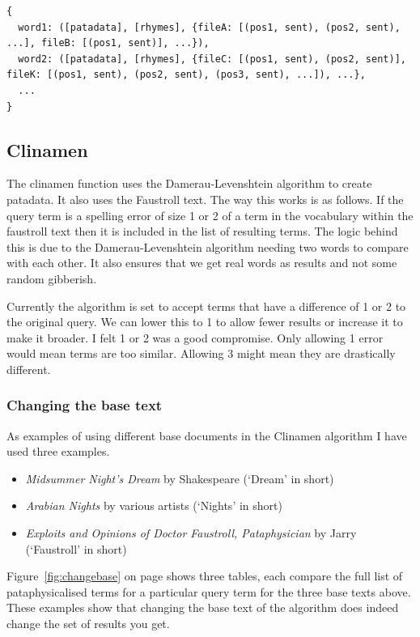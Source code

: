 \begin{verbatim}
{
  word1: ([patadata], [rhymes], {fileA: [(pos1, sent), (pos2, sent), ...], fileB: [(pos1, sent)], ...}),
  word2: ([patadata], [rhymes], {fileC: [(pos1, sent), (pos2, sent)], fileK: [(pos1, sent), (pos2, sent), (pos3, sent), ...]), ...},
  ...
}
\end{verbatim}


\subsection{Clinamen}
\label{s:clinanal}

The clinamen function uses the Damerau-Levenshtein algorithm to create pata\-data. It also uses the Faustroll text. The way this works is as follows. If the query term is a spelling error of size 1 or 2 of a term in the vocabulary within the faustroll text then it is included in the list of resulting terms. The logic behind this is due to the Damerau-Levenshtein algorithm needing two words to compare with each other. It also ensures that we get real words as results and not some random gibberish.

Currently the algorithm is set to accept terms that have a difference of 1 or 2 to the original query. We can lower this to 1 to allow fewer results or increase it to make it broader. I felt 1 or 2 was a good compromise. Only allowing 1 error would mean terms are too similar. Allowing 3 might mean they are drastically different.


\subsubsection{Changing the base text}
\label{s:basetext}

As examples of using different base documents in the Clinamen algorithm I have used three examples. 

\begin{itemize}
  \item \textit{Midsummer Night's Dream} by Shakespeare (`Dream' in short)
  \item \textit{Arabian Nights} by various artists (`Nights' in short)
  \item \textit{Exploits and Opinions of Doctor Faustroll, Pataphysician} by Jarry (`Faustroll' in short)
\end{itemize}

Figure~\ref{fig:changebase} on page \pageref{fig:changebase} shows three tables, each compare the full list of pataphysicalised terms for a particular query term for the three base texts above. These examples show that changing the base text of the algorithm does indeed change the set of results you get. 

